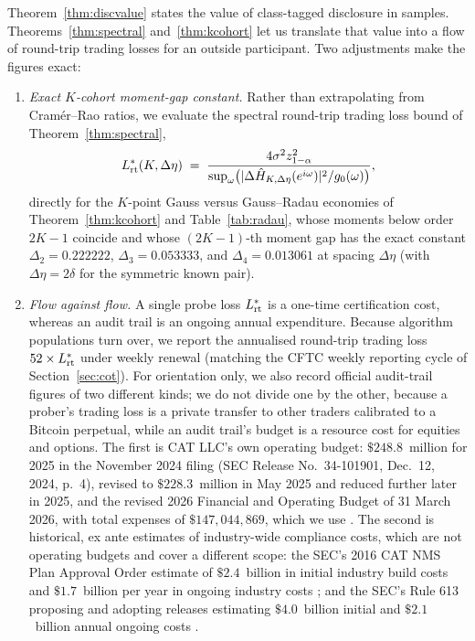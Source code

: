 Theorem~\ref{thm:discvalue} states the value of class-tagged disclosure in samples. Theorems~\ref{thm:spectral} and~\ref{thm:kcohort} let us translate that value into a flow of round-trip trading losses for an outside participant. Two adjustments make the figures exact:
\begin{enumerate}[label=(\roman*),itemsep=1pt]
\item \emph{Exact $K$-cohort moment-gap constant.} Rather than extrapolating from Cram\'er--Rao ratios, we evaluate the spectral round-trip trading loss bound of Theorem~\ref{thm:spectral},
\[
L_{\rm rt}^*(K,\Delta\eta)\;=\;\frac{4\sigma^2 z_{1-\alpha}^2}{\sup_\omega\bigl(|\Delta\hat H_{K,\Delta\eta}(e^{i\omega})|^2/g_0(\omega)\bigr)},
\]
directly for the $K$-point Gauss versus Gauss--Radau economies of Theorem~\ref{thm:kcohort} and Table~\ref{tab:radau}, whose moments below order $2K-1$ coincide and whose $(2K-1)$-th moment gap has the exact constant $\Delta_2=0.222222$, $\Delta_3=0.053333$, and $\Delta_4=0.013061$ at spacing $\Delta\eta$ (with $\Delta\eta=2\delta$ for the symmetric known pair).
\item \emph{Flow against flow.} A single probe loss $L_{\rm rt}^*$ is a one-time certification cost, whereas an audit trail is an ongoing annual expenditure. Because algorithm populations turn over, we report the annualised round-trip trading loss $52\times L_{\rm rt}^*$ under weekly renewal (matching the CFTC weekly reporting cycle of Section~\ref{sec:cot}). For orientation only, we also record official audit-trail figures of two different kinds; we do not divide one by the other, because a prober's trading loss is a private transfer to other traders calibrated to a Bitcoin perpetual, while an audit trail's budget is a resource cost for equities and options. The first is CAT LLC's own operating budget: $\$248.8$~million for 2025 in the November 2024 filing (SEC Release No.\ 34-101901, Dec.\ 12, 2024, p.~4), revised to $\$228.3$~million in May 2025 and reduced further later in 2025, and the revised 2026 Financial and Operating Budget of 31 March 2026, with total expenses of $\$147{,}044{,}869$, which we use \citep{catbudget2026}. The second is historical, ex ante estimates of industry-wide compliance costs, which are not operating budgets and cover a different scope: the SEC's 2016 CAT NMS Plan Approval Order estimate of $\$2.4$~billion in initial industry build costs and $\$1.7$~billion per year in ongoing industry costs \citep[Release No.\ 34-79318, Nov.\ 15, 2016, 81 FR 84696 at 84801, p.~363]{sec2016}; and the SEC's Rule 613 proposing and adopting releases estimating $\$4.0$~billion initial and $\$2.1$~billion annual ongoing costs \citep[Release No.\ 34-62174, May 26, 2010, 75 FR 32556 at 32598, 32600, pp.~147, 153; Release No.\ 34-67457, July 18, 2012, 77 FR 45722 at 45790--45795, pp.~220--238]{sec2012}.
\end{enumerate}

